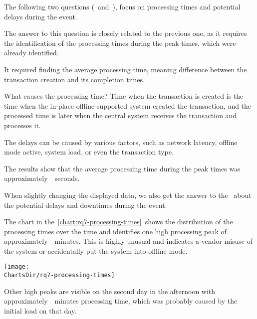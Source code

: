 The following two questions (~and~), focus on processing times and potential delays during the event.


The answer to this question is closely related to the previous one, as it requires the identification of the processing times during the peak times, which were already identified.

It required finding the average processing time, meaning difference between the transaction creation and its completion times.

\begin{infobox}{What causes the processing time?}
	Time when the transaction is created is the time when the in-place offline-supported system created the transaction, and the processed time is later when the central system receives the transaction and processes it.

	The delays can be caused by various factors, such as network latency, offline mode active, system load, or even the transaction type.
\end{infobox}

The results show that the average processing time during the peak times was approximately~~seconds.

When slightly changing the displayed data, we also get the answer to the~ about the potential delays and downtimes during the event.


The chart in the~\autoref{chart:rq7-processing-times}~shows the distribution of the processing times over the time and identifies one high processing peak of approximately~~minutes.
This is highly unusual and indicates a vendor misuse of the system or accidentally put the system into offline mode.

\begin{chart}[H]
	\centering
	\texttt{[image: \\ChartsDir/rq7-processing-times]}
	\caption{ Transaction Processing Times}
	\label{chart:rq7-processing-times}
	\source
\end{chart}

Other high peaks are visible on the second day in the afternoon with approximately~~minutes processing time, which was probably caused by the initial load on that day.

